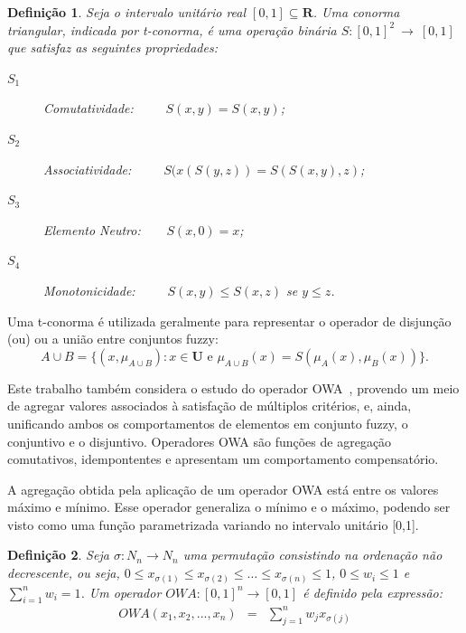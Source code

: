 \documentclass[tcc,capa]{texufpel}
\newtheorem{Def}{Defini\c c\~ao}
\begin{document}
\begin{Def} Seja o intervalo unitário real $[0,1]\subseteq \mathbf{R}$. Uma conorma triangular, indicada por t-conorma, é uma operação binária $S:[0,1]^2~\rightarrow~[0,1]$ que satisfaz as seguintes propriedades:
\begin{description}
  \item [$S_1$] Comutatividade:~~~~~$S(x,y) = S(x,y)$;
  \item [$S_2$] Associatividade:~~~~~$S(x(S(y,z))=S(S(x,y),z)$;
  \item [$S_3$] Elemento Neutro:~~~~$S(x,0)=x$;
  \item [$S_4$] Monotonicidade:~~~~~$S(x,y)\leq S(x,z)$ se $y\leq z$.
\end{description}
\end{Def}
Uma t-conorma é utilizada geralmente para representar o operador de disjunção (ou) ou a união entre conjuntos fuzzy:
\begin{equation}
A \cup B = \{ ( x,\mu_{A \cup B} ) : x \in \mathbf{U} \mbox{  e } \mu_{A \cup B}(x)=S(\mu_{A}(x),\mu_{B}(x)) \}.
\end{equation}

Este trabalho também considera o estudo do operador OWA~\cite{yager2004generalized}, provendo um meio de agregar valores associados à satisfação de múltiplos critérios, e, ainda, unificando ambos os comportamentos de elementos em conjunto fuzzy, o conjuntivo e o disjuntivo. Operadores OWA são funções de agregação comutativos, idempontentes e apresentam um comportamento compensatório. \cite{yager2004owa}

A agregação obtida pela aplicação de um operador OWA está entre os valores máximo e mínimo. Esse operador generaliza o mínimo e o máximo, podendo ser visto como uma função parametrizada variando no intervalo unitário [0,1].

\begin{Def}
Seja $\sigma \colon N_n \rightarrow N_n$ uma permutação consistindo na ordenação não decrescente, ou seja, 
$0\leq x_{\sigma(1)} \leq x_{\sigma(2)} \leq \ldots \leq x_{\sigma(n)} \leq 1$,  $0 \leq w_{i} \leq 1$ e $\sum_{i=1}^{n} w_{i}=1$. Um operador \mbox{$OWA \colon [0,1]^n \rightarrow [0,1]$} é definido pela expressão:\vspace{-0.2cm}
\begin{eqnarray}\label{eq-OWA}
 OWA(x_{1},x_{2},...,x_{n}) &=& \sum_{j=1}^{n} w_{j} x_{\sigma(j)}
\end{eqnarray}
\end{Def}
\end{document}
